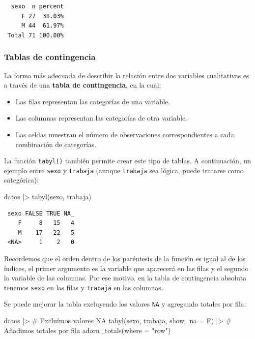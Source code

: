 \documentclass[
  spanish,
  a4paper,
]{scrbook}
\newenvironment{Shaded}{\begin{snugshade}}{\end{snugshade}}
\newcommand{\AttributeTok}[1]{\textcolor[rgb]{0.40,0.45,0.13}{#1}}
\newcommand{\CommentTok}[1]{\textcolor[rgb]{0.37,0.37,0.37}{#1}}
\newcommand{\FunctionTok}[1]{\textcolor[rgb]{0.28,0.35,0.67}{#1}}
\newcommand{\NormalTok}[1]{\textcolor[rgb]{0.00,0.23,0.31}{#1}}
\newcommand{\SpecialCharTok}[1]{\textcolor[rgb]{0.37,0.37,0.37}{#1}}
\newcommand{\StringTok}[1]{\textcolor[rgb]{0.13,0.47,0.30}{#1}}
\begin{document}
\begin{verbatim}
  sexo  n percent
     F 27  38.03%
     M 44  61.97%
 Total 71 100.00%
\end{verbatim}

\subsubsection{Tablas de contingencia}\label{tablas-de-contingencia}

La forma más adecuada de describir la relación entre dos variables
cualitativas es a través de una \textbf{tabla de contingencia}, en la
cual:

\begin{itemize}
\item
  Las filas representan las categorías de una variable.
\item
  Las columnas representan las categorías de otra variable.
\item
  Las celdas muestran el número de observaciones correspondientes a cada
  combinación de categorías.
\end{itemize}

La función \texttt{tabyl()} también permite crear este tipo de tablas. A
continuación, un ejemplo entre \texttt{sexo} y \texttt{trabaja} (aunque
\texttt{trabaja} sea lógica, puede tratarse como categórica):

\begin{Shaded}
\begin{Highlighting}[]
\NormalTok{datos }\SpecialCharTok{|\textgreater{}}
  \FunctionTok{tabyl}\NormalTok{(sexo, trabaja)}
\end{Highlighting}
\end{Shaded}

\begin{verbatim}
 sexo FALSE TRUE NA_
    F     8   15   4
    M    17   22   5
 <NA>     1    2   0
\end{verbatim}

Recordemos que el orden dentro de los paréntesis de la función es igual
al de los índices, el primer argumento es la variable que aparecerá en
las filas y el segundo la variable de las columnas. Por ese motivo, en
la tabla de contingencia absoluta tenemos \texttt{sexo} en las filas y
\texttt{trabaja} en las columnas.

Se puede mejorar la tabla excluyendo los valores \texttt{NA} y agregando
totales por fila:

\begin{Shaded}
\begin{Highlighting}[]
\NormalTok{datos }\SpecialCharTok{|\textgreater{}}
  \CommentTok{\# Excluímos valores NA}
  \FunctionTok{tabyl}\NormalTok{(sexo, trabaja, }\AttributeTok{show\_na =}\NormalTok{ F) }\SpecialCharTok{|\textgreater{}}
  \CommentTok{\# Añadimos totales por fila}
  \FunctionTok{adorn\_totals}\NormalTok{(}\AttributeTok{where =} \StringTok{"row"}\NormalTok{)}
\end{Highlighting}
\end{Shaded}
\end{document}
